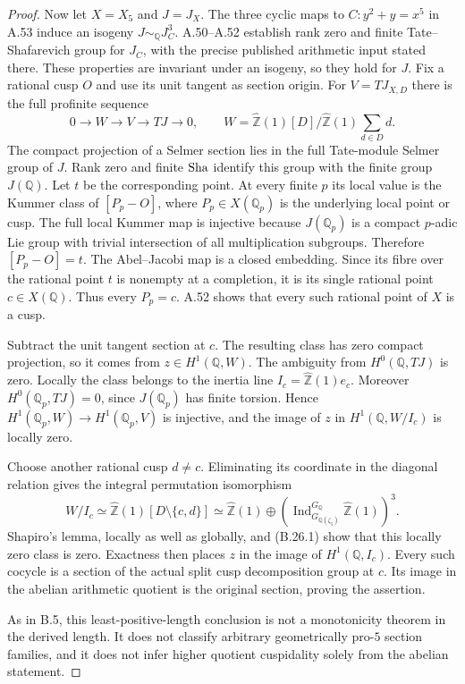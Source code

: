 \begin{proof}
Now let $X=X_5$ and $J=J_X$. The three cyclic
maps to $C:y^2+y=x^5$ in A.53 induce an isogeny
$J\sim_{\mathbb Q}J_C^3$. A.50--A.52 establish
rank zero and finite Tate--Shafarevich group for
$J_C$, with the precise published arithmetic
input stated there. These properties are invariant
under an isogeny, so they hold for $J$.
Fix a rational cusp $O$ and use its unit tangent
as section origin. For
$V=TJ_{X,D}$ there is the full profinite sequence
\[
 0\longrightarrow W\longrightarrow V\longrightarrow TJ
     \longrightarrow0,\qquad
 W=\widehat{\mathbb Z}(1)[D]/
       \widehat{\mathbb Z}(1)\sum_{d\in D}d .
                                                               \tag{B.26.2}
\]
The compact projection of a Selmer section lies in
the full Tate-module Selmer group of $J$.
Rank zero and finite $\mathop{\mathrm{Sha}}$ identify this group
with the finite group $J(\mathbb Q)$.
Let $t$ be the corresponding point.
At every finite $p$ its local value is the Kummer
class of $[P_p-O]$, where $P_p\in X(\mathbb Q_p)$
is the underlying local point or cusp.
The full local Kummer map is injective because
$J(\mathbb Q_p)$ is a compact $p$-adic Lie group
with trivial intersection of all multiplication
subgroups. Therefore $[P_p-O]=t$.
The Abel--Jacobi map is a closed embedding.
Since its fibre over the rational point $t$ is
nonempty at a completion, it is its single
rational point $c\in X(\mathbb Q)$.
Thus every $P_p=c$. A.52 shows that every such
rational point of $X$ is a cusp.

Subtract the unit tangent section at $c$.
The resulting class has zero compact projection,
so it comes from $z\in H^1(\mathbb Q,W)$.
The ambiguity from $H^0(\mathbb Q,TJ)$ is zero.
Locally the class belongs to the inertia line
$I_c=\widehat{\mathbb Z}(1)e_c$.
Moreover $H^0(\mathbb Q_p,TJ)=0$, since
$J(\mathbb Q_p)$ has finite torsion. Hence
$H^1(\mathbb Q_p,W)\to H^1(\mathbb Q_p,V)$
is injective, and the image of $z$ in
$H^1(\mathbb Q,W/I_c)$ is locally zero.

Choose another rational cusp $d\ne c$.
Eliminating its coordinate in the diagonal
relation gives the integral permutation isomorphism
\[
 W/I_c\simeq
 \widehat{\mathbb Z}(1)[D\setminus\{c,d\}]
 \simeq\widehat{\mathbb Z}(1)\oplus
 \left(\operatorname{Ind}_{G_{\mathbb Q(\zeta_5)}}^{G_{\mathbb Q}}
                   \widehat{\mathbb Z}(1)\right)^3 .
                                                               \tag{B.26.3}
\]
Shapiro's lemma, locally as well as globally,
and (B.26.1) show that this locally zero class
is zero. Exactness then places $z$ in
the image of $H^1(\mathbb Q,I_c)$.
Every such cocycle is a section of the actual
split cusp decomposition group at $c$.
Its image in the abelian arithmetic quotient is
the original section, proving the assertion.

As in B.5, this least-positive-length conclusion
is not a monotonicity theorem in the derived
length. It does not classify arbitrary
geometrically pro-$5$ section families, and it
does not infer higher quotient cuspidality
solely from the abelian statement.
\end{proof}

